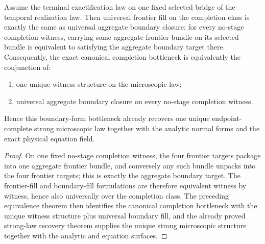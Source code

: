 \begin{theorem}
\label{thm:canonical-completion-bottleneck-iff-canonical-flagship-witness-plus-universal-boundary-fill}
Assume the terminal exactification law on one fixed selected bridge of the
temporal realization law. Then universal frontier fill on the
completion class is exactly the same as universal aggregate boundary closure:
for every no-stage completion witness, carrying some aggregate
frontier bundle on its selected bundle is equivalent to satisfying the
aggregate boundary target there. Consequently, the exact canonical
completion bottleneck is equivalently the conjunction of:
\begin{enumerate}
\item one unique witness structure on the microscopic law;
\item universal aggregate boundary closure on every
      no-stage completion witness.
\end{enumerate}
Hence this boundary-form bottleneck already recovers one unique
endpoint-complete strong microscopic law together with the analytic normal forms
and the exact physical equation field.
\end{theorem}

\begin{proof}
On one fixed no-stage completion witness, the four frontier targets package
into one aggregate frontier bundle, and conversely any such bundle unpacks into
the four frontier targets; this is exactly the aggregate boundary target. The
frontier-fill and boundary-fill formulations are therefore equivalent witness
by witness, hence also universally over the completion class. The
preceding equivalence theorem then identifies the canonical completion
bottleneck with the unique witness structure plus universal boundary
fill, and the already proved strong-law recovery theorem supplies the unique
strong microscopic structure together with the analytic and equation surfaces.
\end{proof}

